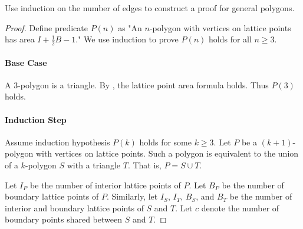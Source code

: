 \documentclass{report}
\begin{document}
  Use induction on the number of edges to construct a proof for general
    polygons.

  \begin{proof}

    Define predicate $P(n)$ as "An $n$-polygon with vertices on lattice points
      has area $I + \frac{1}{2}B - 1$."
    We use induction to prove $P(n)$ holds for all $n \geq 3$.

    \paragraph{Base Case}%

      A $3$-polygon is a triangle.
      By , the lattice point area formula holds.
      Thus $P(3)$ holds.

    \paragraph{Induction Step}%

      Assume induction hypothesis $P(k)$ holds for some $k \geq 3$.
      Let $P$ be a $(k + 1)$-polygon with vertices on lattice points.
      Such a polygon is equivalent to the union of a $k$-polygon $S$ with a
        triangle $T$.
      That is, $P = S \cup T$.

      Let $I_P$ be the number of interior lattice points of $P$.
      Let $B_P$ be the number of boundary lattice points of $P$.
      Similarly, let $I_S$, $I_T$, $B_S$, and $B_T$ be the number of interior
        and boundary lattice points of $S$ and $T$.
      Let $c$ denote the number of boundary points shared between $S$ and $T$.


\end{proof}
\end{document}
